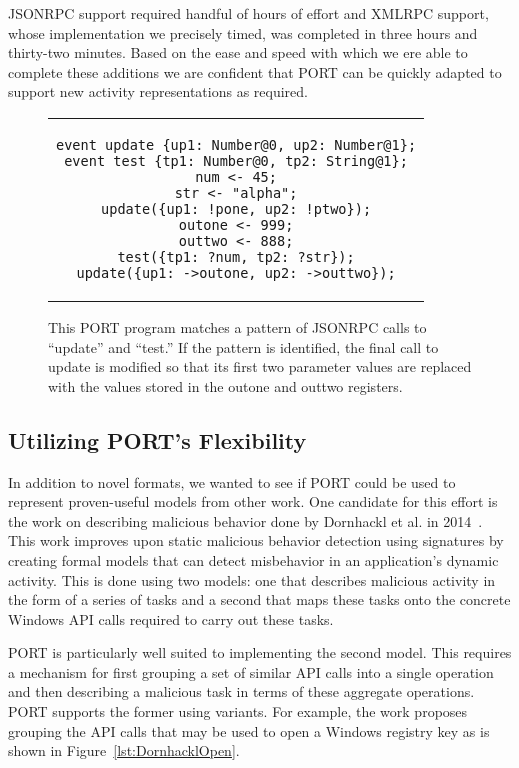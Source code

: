 JSONRPC support required handful of hours of effort and XMLRPC
support, whose implementation we precisely timed, was completed in three
hours and thirty-two minutes.  Based on the ease and speed with which we
ere able to complete these additions we are confident that PORT can be
quickly adapted to support new activity representations as required.

\begin{figure}[H]
\centering
\begin{tabular}{c}
\begin{lstlisting}
event update {up1: Number@0, up2: Number@1};
event test {tp1: Number@0, tp2: String@1};
num <- 45;
str <- "alpha";
update({up1: !pone, up2: !ptwo});
outone <- 999;
outtwo <- 888;
test({tp1: ?num, tp2: ?str});
update({up1: ->outone, up2: ->outtwo});
\end{lstlisting}
\end{tabular}
\caption{This PORT program matches a pattern of JSONRPC calls to
  ``update'' and ``test.''  If the pattern is identified, the final call to
  update is modified so that its first two parameter values are replaced
  with the values stored in the outone and outtwo registers.}
\label{lst:JSONProgram}
\end{figure}


\subsection{Utilizing PORT's Flexibility}
In addition to novel formats, we wanted to see if PORT could be used to
represent proven-useful models from other work.  One candidate for this
effort is the work on describing malicious behavior done by Dornhackl et
al. in 2014~\cite{Dornhackl2014}.  This work improves upon static malicious
behavior detection using signatures by creating formal models that can
detect misbehavior in an application's dynamic activity.  This is done
using two models: one that describes malicious activity in the form of a
series of tasks and a second that maps these tasks onto the concrete
Windows API calls required to carry out these tasks.

PORT is particularly well suited to implementing the second model.  This
requires a mechanism for first grouping a set of similar API calls
into a single operation and then describing a malicious task in terms of
these aggregate operations.  PORT supports the former using variants.
For example, the work proposes grouping the API calls that may be used to
open a Windows registry key as is shown in Figure~\ref{lst:DornhacklOpen}.

